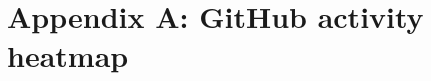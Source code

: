      \chapter{Appendix A: GitHub activity heatmap}

     \begin{figure}[!htb]
     \centering
	\label{fig:github}
	\end{figure}
